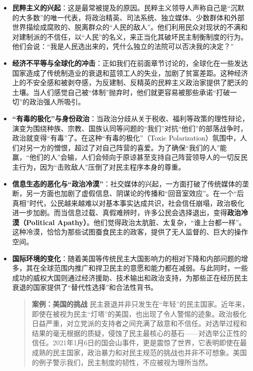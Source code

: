\begin{itemize}
    \item \textbf{民粹主义的兴起}：这是最常被提及的原因。民粹主义领导人声称自己是“沉默的大多数”的唯一代表，将政治精英、司法系统、独立媒体、少数群体和外部世界描绘成腐败的、脱离群众的“人民的敌人”。他们利用民众对现状的不满和对建制派的不信任，以“人民”的名义，来正当化其破坏民主制衡制度的行为。他们会说：“我是人民选出来的，凭什么独立的法院可以否决我的决定？”
    \item \textbf{经济不平等与全球化的冲击}：正如我们在前面章节讨论的，全球化在一些发达国家造成了传统制造业的衰退和蓝领工人的失业，加剧了贫富差距。这种经济上的不安全感和被剥夺感，为反建制、反精英的民粹主义政治家提供了肥沃的土壤。当人们感觉自己被“体制”抛弃时，他们就更容易被那些承诺“打破一切”的政治强人所吸引。
    \item \textbf{“有毒的极化”与身份政治}：当政治分歧从关于税收、福利等政策的理性辩论，演变为围绕种族、宗教、国族认同等问题的“我们”对抗“他们”的部落战争时，政治就变得“有毒”了。在这种“有毒的极化”（Toxic Polarization）氛围中，人们对另一方的憎恨，超过了对自己阵营的喜爱。为了确保“我们的人”能赢，“他们的人”会输，人们会倾向于原谅甚至支持自己阵营领导人的一切反民主行为，因为“击败敌人”压倒了对民主程序本身的尊重。
    \item \textbf{信息生态的恶化与“政治冷漠”}：社交媒体的兴起，一方面打破了传统媒体的垄断，另一方面也加剧了虚假信息、阴谋论的传播和“回音室效应”。在一个“后真相”时代，公民越来越难以对基本事实达成共识，社会信任崩塌，政治极化进一步加剧。而当信息过载、真假难辨时，许多公民会选择退出，变得\textbf{政治冷漠（Political Apathy）}。他们觉得政治太肮脏、太复杂，“谁上台都一样”。这种冷漠，恰恰为那些试图蚕食民主的政客，提供了无人监督的、巨大的操作空间。
    \item \textbf{国际环境的变化}：随着美国等传统民主大国影响力的相对下降和内部问题的增多，其在全球范围内推广和捍卫民主的意愿和能力都在减弱。与此同时，一些成功的威权大国则通过经济援助、技术输出和政治支持，为那些正在经历民主衰退的国家提供了“替代性选择”和合法性背书。
    \begin{quote}
    \textbf{案例：美国的挑战}
    民主衰退并非只发生在“年轻”的民主国家。近年来，即使在被视为民主“灯塔”的美国，也出现了令人警惕的迹象。政治极化日益严重，对立党派的支持者之间充满了敌意和不信任。对选举过程和结果的毫无根据的质疑，侵蚀了民主最核心的基石——对选举公正性的信任。2021年1月6日的国会山事件，更是震惊了世界，它表明即使在最成熟的民主国家，政治暴力和对民主规范的挑战也并非不可想象。美国的例子警示我们，民主制度的韧性，不应被视为理所当然。
    \end{quote}
\end{itemize}

